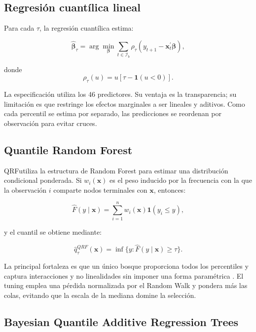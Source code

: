 \documentclass[11pt,a4paper]{article}
\newcommand{\qrf}{\textsc{QRF}}
\begin{document}
\subsection{Regresión cuantílica lineal}

Para cada \(\tau\), la regresión cuantílica estima:

\begin{equation}
  \widehat{\bm\beta}_{\tau}
  =
  \arg\min_{\bm\beta}
  \sum_{t\in\mathcal{I}_b}
  \rho_{\tau}
  \left(y_{t+1}-\bm x_t^{\prime}\bm\beta\right),
\end{equation}

donde
\begin{equation}
  \rho_{\tau}(u)=u\left[\tau-\mathbf{1}(u<0)\right].
\end{equation}

La especificación utiliza los 46 predictores. Su ventaja es la transparencia;
su limitación es que restringe los efectos marginales a ser lineales y
aditivos. Como cada percentil se estima por separado, las predicciones se
reordenan por observación para evitar cruces.

\subsection{Quantile Random Forest}

\qrf utiliza la estructura de Random Forest para estimar una distribución
condicional ponderada. Si \(w_i(\bm x)\) es el peso inducido por la frecuencia
con la que la observación \(i\) comparte nodos terminales con \(\bm x\),
entonces:

\begin{equation}
  \widehat F(y\mid\bm x)
  =
  \sum_{i=1}^{n}w_i(\bm x)\mathbf{1}(y_i\leq y),
\end{equation}

y el cuantil se obtiene mediante:

\begin{equation}
  \widehat q_{\tau}^{QRF}(\bm x)
  =
  \inf\{y:\widehat F(y\mid\bm x)\geq\tau\}.
\end{equation}

La principal fortaleza es que un único bosque proporciona todos los
percentiles y captura interacciones y no linealidades sin imponer una forma
paramétrica \cite{meinshausen2006}. El tuning emplea una pérdida normalizada
por el Random Walk y pondera más las colas, evitando que la escala de la
mediana domine la selección.

\subsection{Bayesian Quantile Additive Regression Trees}
\end{document}
